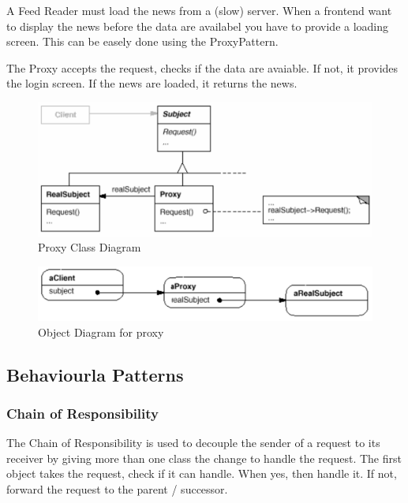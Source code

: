 \documentclass[11pt]{article}
\begin{document}
A Feed Reader must load the news from a (slow) server.
When a frontend want to display the news before the data are availabel you have to provide a loading screen.
This can be easely done using the ProxyPattern.

The Proxy accepts the request, checks if the data are avaiable.
If not, it provides the login screen.
If the news are loaded, it returns the news.


\begin{figure}[htbp]
\centering
\includegraphics[width=.9\linewidth]{img/proxy.png}
\caption{\label{fig:proxy-class-diagram}Proxy Class Diagram}
\end{figure}


\begin{figure}[htbp]
\centering
\includegraphics[width=.9\linewidth]{img/proxy_object_diagram.png}
\caption{\label{fig:object-diagram-for-proxy}Object Diagram for proxy}
\end{figure}

\subsection{Behaviourla Patterns}
\label{sec:orgd335dfb}
\subsubsection{Chain of Responsibility}
\label{sec:orgca409d4}
The Chain of Responsibility is used to decouple the sender of a request to its receiver by giving more than one class the change to handle the request.
The first object takes the request, check if it can handle.
When yes, then handle it.
If not, forward the request to the parent / successor.
\end{document}
